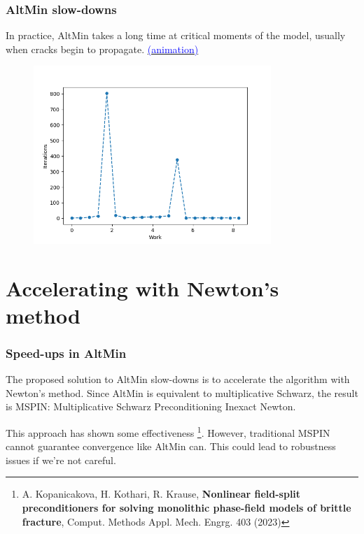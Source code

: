 \documentclass{beamer}
\begin{document}
\begin{frame}
\frametitle{AltMin slow-downs}

In practice, AltMin takes a long time at critical moments of the model, usually when cracks begin to propagate.
\href{MOV_CTFM_propagation.mp4}{\textcolor{blue}{(animation)}}

\begin{figure}
	\centering
	\includegraphics[width=0.8\textwidth]{PLOT_CTFM_its.png}
\end{figure}


\end{frame}

\section{Accelerating with Newton's method}

\begin{frame}
\frametitle{Speed-ups in AltMin}

The proposed solution to AltMin slow-downs is to accelerate the algorithm with Newton's method.
Since AltMin is equivalent to multiplicative Schwarz, the result is MSPIN: Multiplicative Schwarz Preconditioning Inexact Newton.

This approach has shown some effectiveness \footnote{A. Kopanicakova, H. Kothari, R. Krause, \textbf{Nonlinear field-split preconditioners for solving monolithic phase-field models of brittle fracture}, Comput. Methods Appl. Mech. Engrg. 403 (2023)}.
However, traditional MSPIN cannot guarantee convergence like AltMin can.
This could lead to robustness issues if we're not careful.
\end{frame}
\end{document}
